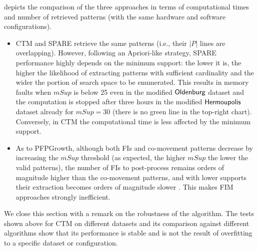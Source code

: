 \documentclass[
]{ceurart}
\renewcommand{\sf}[1]{\textsf{\textup{#1}}}
\newcommand{\mf}[1]{#1}
\begin{document}
\mf{
 depicts the comparison of the three approaches in terms of computational times and number of retrieved patterns (with the same hardware and software configurations).

\begin{itemize}
    \item CTM and SPARE retrieve the same patterns (i.e., their $|P|$ lines are overlapping).
    However, following an Apriori-like strategy, SPARE performance highly depends on the minimum support: the lower it is, the higher the likelihood of extracting patterns with sufficient cardinality and the wider the portion of search space to be enumerated.
    This results in memory faults when $mSup$ is below 25 even in the modified $\sf{Oldenburg}$ dataset and the computation is stopped after three hours in the modified $\sf{Hermoupolis}$ dataset already for $mSup=30$ (there is no green line in the top-right chart). 
    Conversely, in CTM the computational time is less affected by the minimum support. %
    \item As to PFPGrowth, although both FIs and co-movement patterns decrease by increasing the $mSup$ threshold (as expected, the higher $mSup$ the lower the valid patterns), the number of FIs to post-process remains orders of magnitude higher than the co-movement patterns, and with lower supports their extraction becomes orders of magnitude slower \citep{DBLP:journals/tkde/LuccheseOP06}.
    This makes FIM approaches strongly inefficient.
\end{itemize}
We close this section with a remark on the robustness of the algorithm. The tests shown above for CTM on different datasets and its comparison against different algorithms show that its performance is stable and is not the result of overfitting to a specific dataset or configuration.
}
\end{document}
